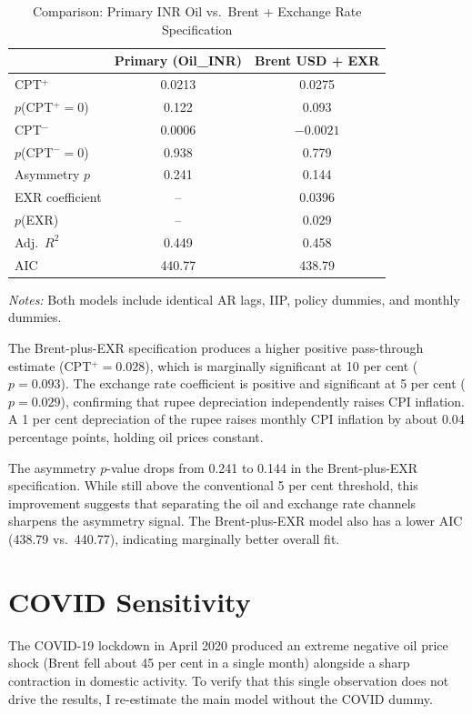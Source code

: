 \begin{table}[H]
\centering
\caption{Comparison: Primary INR Oil vs.\ Brent + Exchange Rate Specification}
\label{tab:brentexr}
\begin{tabular}{lcc}
\toprule
& \textbf{Primary (Oil\_INR)} & \textbf{Brent USD + EXR} \\
\midrule
CPT$^+$ & 0.0213 & 0.0275 \\
$p$(CPT$^+ = 0$) & 0.122 & 0.093 \\
CPT$^-$ & 0.0006 & $-0.0021$ \\
$p$(CPT$^- = 0$) & 0.938 & 0.779 \\
Asymmetry $p$ & 0.241 & 0.144 \\
EXR coefficient & -- & 0.0396 \\
$p$(EXR) & -- & 0.029 \\
Adj.\ $R^2$ & 0.449 & 0.458 \\
AIC & 440.77 & 438.79 \\
\bottomrule
\end{tabular}
\begin{flushleft}
\vspace{0.3em}
\small\textit{Notes:} Both models include identical AR lags, IIP, policy dummies, and monthly dummies.
\end{flushleft}
\end{table}

The Brent-plus-EXR specification produces a higher positive pass-through estimate (CPT$^+ = 0.028$), which is marginally significant at 10 per cent ($p = 0.093$). The exchange rate coefficient is positive and significant at 5 per cent ($p = 0.029$), confirming that rupee depreciation independently raises CPI inflation. A 1 per cent depreciation of the rupee raises monthly CPI inflation by about 0.04 percentage points, holding oil prices constant.

The asymmetry $p$-value drops from 0.241 to 0.144 in the Brent-plus-EXR specification. While still above the conventional 5 per cent threshold, this improvement suggests that separating the oil and exchange rate channels sharpens the asymmetry signal. The Brent-plus-EXR model also has a lower AIC (438.79 vs.\ 440.77), indicating marginally better overall fit.

\section{COVID Sensitivity}

The COVID-19 lockdown in April 2020 produced an extreme negative oil price shock (Brent fell about 45 per cent in a single month) alongside a sharp contraction in domestic activity. To verify that this single observation does not drive the results, I re-estimate the main model without the COVID dummy.

